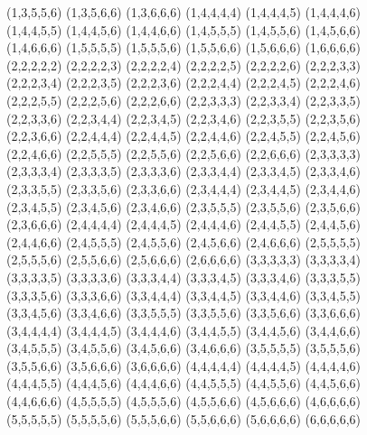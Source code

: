 \begin{tabbing}
(1,3,5,5,6) \> (1,3,5,6,6) \> (1,3,6,6,6) \> (1,4,4,4,4) \> (1,4,4,4,5) \> (1,4,4,4,6) \\ 
(1,4,4,5,5) \> (1,4,4,5,6) \> (1,4,4,6,6) \> (1,4,5,5,5) \> (1,4,5,5,6) \> (1,4,5,6,6) \\ 
(1,4,6,6,6) \> (1,5,5,5,5) \> (1,5,5,5,6) \> (1,5,5,6,6) \> (1,5,6,6,6) \> (1,6,6,6,6) \\ 
(2,2,2,2,2) \> (2,2,2,2,3) \> (2,2,2,2,4) \> (2,2,2,2,5) \> (2,2,2,2,6) \> (2,2,2,3,3) \\ 
(2,2,2,3,4) \> (2,2,2,3,5) \> (2,2,2,3,6) \> (2,2,2,4,4) \> (2,2,2,4,5) \> (2,2,2,4,6) \\ 
(2,2,2,5,5) \> (2,2,2,5,6) \> (2,2,2,6,6) \> (2,2,3,3,3) \> (2,2,3,3,4) \> (2,2,3,3,5) \\ 
(2,2,3,3,6) \> (2,2,3,4,4) \> (2,2,3,4,5) \> (2,2,3,4,6) \> (2,2,3,5,5) \> (2,2,3,5,6) \\ 
(2,2,3,6,6) \> (2,2,4,4,4) \> (2,2,4,4,5) \> (2,2,4,4,6) \> (2,2,4,5,5) \> (2,2,4,5,6) \\ 
(2,2,4,6,6) \> (2,2,5,5,5) \> (2,2,5,5,6) \> (2,2,5,6,6) \> (2,2,6,6,6) \> (2,3,3,3,3) \\ 
(2,3,3,3,4) \> (2,3,3,3,5) \> (2,3,3,3,6) \> (2,3,3,4,4) \> (2,3,3,4,5) \> (2,3,3,4,6) \\ 
(2,3,3,5,5) \> (2,3,3,5,6) \> (2,3,3,6,6) \> (2,3,4,4,4) \> (2,3,4,4,5) \> (2,3,4,4,6) \\ 
(2,3,4,5,5) \> (2,3,4,5,6) \> (2,3,4,6,6) \> (2,3,5,5,5) \> (2,3,5,5,6) \> (2,3,5,6,6) \\ 
(2,3,6,6,6) \> (2,4,4,4,4) \> (2,4,4,4,5) \> (2,4,4,4,6) \> (2,4,4,5,5) \> (2,4,4,5,6) \\ 
(2,4,4,6,6) \> (2,4,5,5,5) \> (2,4,5,5,6) \> (2,4,5,6,6) \> (2,4,6,6,6) \> (2,5,5,5,5) \\ 
(2,5,5,5,6) \> (2,5,5,6,6) \> (2,5,6,6,6) \> (2,6,6,6,6) \> (3,3,3,3,3) \> (3,3,3,3,4) \\ 
(3,3,3,3,5) \> (3,3,3,3,6) \> (3,3,3,4,4) \> (3,3,3,4,5) \> (3,3,3,4,6) \> (3,3,3,5,5) \\ 
(3,3,3,5,6) \> (3,3,3,6,6) \> (3,3,4,4,4) \> (3,3,4,4,5) \> (3,3,4,4,6) \> (3,3,4,5,5) \\ 
(3,3,4,5,6) \> (3,3,4,6,6) \> (3,3,5,5,5) \> (3,3,5,5,6) \> (3,3,5,6,6) \> (3,3,6,6,6) \\ 
(3,4,4,4,4) \> (3,4,4,4,5) \> (3,4,4,4,6) \> (3,4,4,5,5) \> (3,4,4,5,6) \> (3,4,4,6,6) \\ 
(3,4,5,5,5) \> (3,4,5,5,6) \> (3,4,5,6,6) \> (3,4,6,6,6) \> (3,5,5,5,5) \> (3,5,5,5,6) \\ 
(3,5,5,6,6) \> (3,5,6,6,6) \> (3,6,6,6,6) \> (4,4,4,4,4) \> (4,4,4,4,5) \> (4,4,4,4,6) \\ 
(4,4,4,5,5) \> (4,4,4,5,6) \> (4,4,4,6,6) \> (4,4,5,5,5) \> (4,4,5,5,6) \> (4,4,5,6,6) \\ 
(4,4,6,6,6) \> (4,5,5,5,5) \> (4,5,5,5,6) \> (4,5,5,6,6) \> (4,5,6,6,6) \> (4,6,6,6,6) \\ 
(5,5,5,5,5) \> (5,5,5,5,6) \> (5,5,5,6,6) \> (5,5,6,6,6) \> (5,6,6,6,6) \> (6,6,6,6,6) \\ 
\end{tabbing}

